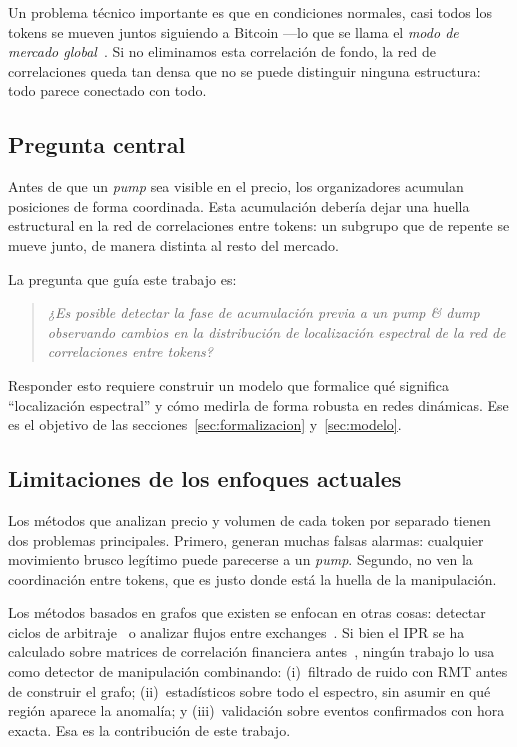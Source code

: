 Un problema técnico importante es que en condiciones normales, casi todos los
tokens se mueven juntos siguiendo a Bitcoin ---lo que se llama el \emph{modo de
mercado global}~\cite{plerou1999}. Si no eliminamos esta correlación de fondo,
la red de correlaciones queda tan densa que no se puede distinguir ninguna
estructura: todo parece conectado con todo.

\subsection{Pregunta central}

Antes de que un \emph{pump} sea visible en el precio, los organizadores acumulan
posiciones de forma coordinada. Esta acumulación debería dejar una huella
estructural en la red de correlaciones entre tokens: un subgrupo que de repente
se mueve junto, de manera distinta al resto del mercado.

La pregunta que guía este trabajo es:
\begin{quote}
  \emph{¿Es posible detectar la fase de acumulación previa a un \emph{pump \&
  dump} observando cambios en la distribución de localización espectral de la
  red de correlaciones entre tokens?}
\end{quote}

Responder esto requiere construir un modelo que formalice qué significa
``localización espectral'' y cómo medirla de forma robusta en redes dinámicas.
Ese es el objetivo de las secciones~\ref{sec:formalizacion} y~\ref{sec:modelo}.

\subsection{Limitaciones de los enfoques actuales}

Los métodos que analizan precio y volumen de cada token por separado tienen dos
problemas principales. Primero, generan muchas falsas alarmas: cualquier
movimiento brusco legítimo puede parecerse a un \emph{pump}. Segundo, no ven la
coordinación entre tokens, que es justo donde está la huella de la
manipulación.

Los métodos basados en grafos que existen se enfocan en otras cosas: detectar
ciclos de arbitraje~\cite{wang2022} o analizar flujos entre
exchanges~\cite{soramaki2007}. Si bien el IPR se ha calculado sobre matrices de
correlación financiera antes~\cite{plerou1999,nobi2013}, ningún trabajo lo usa
como detector de manipulación combinando: (i)~filtrado de ruido con RMT antes
de construir el grafo; (ii)~estadísticos sobre todo el espectro, sin asumir en
qué región aparece la anomalía; y (iii)~validación sobre eventos confirmados
con hora exacta. Esa es la contribución de este trabajo.

